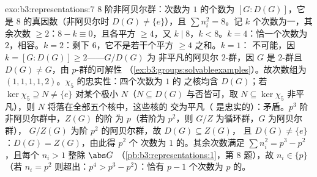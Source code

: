 \begin{solution}{exo:b3:representations:7}
$8$ 阶非阿贝尔群：次数为 $1$ 的个数为
$[G : D(G)]$，它是 $8$ 的真因数（非阿贝尔时 $D(G) \neq
\{e\}$），且 $\sum n_i^2 = 8$。记 $k$ 个次数为一，其余次数
$\geq 2$：$8 - k \equiv 0$，且各平方 $\geq 4$，又 $k
\mid 8$，$k < 8$。$k = 4$：恰一个次数为 $2$，相容。$k =
2$：剩下 $6$，它不是若干个平方 $\geq 4$ 之和。$k = 1$：
不可能，因 $k = [G : D(G)] \geq 2$——$G/D(G)$ 为
非平凡的阿贝尔 $2$-群，因 $G$ 是 $2$-群且
$D(G) \neq G$，由 $p$-群的可解性
（\cref{ex:b3:groups:solvableexamples}）。故次数组为
$(1,1,1,1,2)$。$\chi_5$ 的忠实性：四个次数为 $1$ 的
之核均含 $D(G)$；若 $\ker\chi_5
\supseteq N \neq \{e\}$ 对某个极小 $N$（$N
\subseteq D(G)$ 与否皆可，取 $N \subseteq \ker\chi_5$
非平凡），则 $N$ 将落在全部五个核中，这些核的
交为平凡（
是忠实的）：矛盾。$p^3$ 阶非阿贝尔群中，$Z(G)$ 的阶
为 $p$（若阶为 $p^2$，则 $G/Z$ 为循环群，$G$ 为阿贝尔群），
$G/Z(G)$ 为阶 $p^2$ 的阿贝尔群，故 $D(G) \subseteq Z(G)$，
且 $D(G) \ne \{e\}$：$D(G) = Z(G)$，由此得 $p^2$ 个
次数为 $1$ 的。其余次数满足 $\sum n_i^2 = p^3 -
p^2$，且每个 $n_i > 1$ 整除 $\abs G$
（\cref{pb:b3:representations:1}，第 8 题），故 $n_i \in
\{p\}$（若 $n_i = p^2$ 则超出：$p^4 > p^3 - p^2$）：恰有 $p
- 1$ 个次数为 $p$ 的。
\end{solution}

